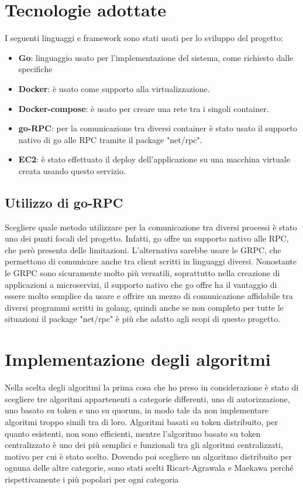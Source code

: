 \documentclass[conference]{IEEEtran}
\begin{document}
\section{Tecnologie adottate}
I seguenti linguaggi e framework sono stati usati per lo sviluppo del progetto:
\begin{itemize}
\item \textbf{Go}: linguaggio usato per l'implementazione del sistema, come richiesto dalle specifiche
\item \textbf{Docker}: è usato come supporto alla virtualizzazione.
\item \textbf{Docker-compose}: è usato per creare una rete tra i singoli container.
\item \textbf{go-RPC}: per la comunicazione tra diversi container è stato usato il supporto nativo di go alle RPC tramite il package "net/rpc".
\item \textbf{EC2}: è stato effettuato il deploy dell'applicazione su una macchina virtuale creata usando questo servizio.
\end{itemize}

\subsection*{Utilizzo di go-RPC}

Scegliere quale metodo utilizzare per la comunicazione tra diversi processi è stato uno dei punti focali del progetto. Infatti, go offre un supporto nativo alle RPC, che però presenta delle limitazioni. L'alternativa sarebbe usare le GRPC, che permettono di comunicare anche tra client scritti in linguaggi diversi. Nonostante le GRPC sono sicuramente molto più versatili, soprattutto nella creazione di applicazioni a microservizi, il supporto nativo che go offre ha il vantaggio di essere molto semplice da usare e offrire un mezzo di comunicazione affidabile tra diversi programmi scritti in golang, quindi anche se non completo per tutte le situazioni il package "net/rpc" è più che adatto agli scopi di questo progetto.

\section{Implementazione degli algoritmi}

Nella scelta degli algoritmi la prima cosa che ho preso in considerazione è stato di scegliere tre algoritmi appartenenti a categorie differenti, uno di autorizzazione, uno basato su token e uno su quorum, in modo tale da non implementare algoritmi troppo simili tra di loro. Algoritmi basati su token distribuito, per quanto esistenti, non sono efficienti, mentre l'algoritmo basato su token centralizzato è uno dei più semplici e funzionali tra gli algoritmi centralizzati, motivo per cui è stato scelto. Dovendo poi scegliere un algoritmo distribuito per ognuna delle altre categorie, sono stati scelti Ricart-Agrawala e Maekawa perché rispettivamente i più popolari per ogni categoria
 
\end{document}
